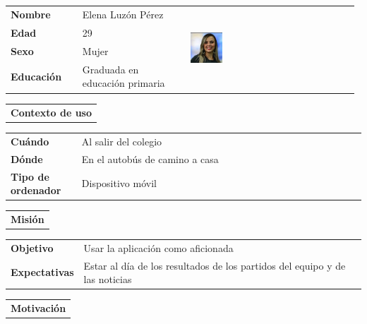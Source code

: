 \documentclass[11pt]{article}
\begin{document}
\begin{table}[H]
  \centering
  \begin{tabular}{p{0.2\linewidth}|p{0.3\linewidth}p{0.475\linewidth}}
    \toprule
    \textbf{Nombre} & Elena Luzón Pérez  &\multirow{4}{*}{\begin{minipage}{1.\textwidth}\includegraphics[width=0.2\textwidth, height=30mm]{Elena}\end{minipage}}\\
    \textbf{Edad} & 29 & \\
    \textbf{Sexo} & Mujer & \\
    \textbf{Educación} & Graduada en educación primaria & \\
    \bottomrule
  \end{tabular}

  \begin{tabular}{l}
    \textbf{Contexto de uso} 
  \end{tabular}
  
  \begin{tabular}{p{0.2\linewidth}|p{0.8\linewidth}}
    \toprule
    \textbf{Cuándo} & Al salir del colegio\\
    \textbf{Dónde}  & En el autobús de camino a casa\\
    \textbf{Tipo de ordenador} & Dispositivo móvil\\
    \bottomrule
  \end{tabular}

  \begin{tabular}{l}
    \textbf{Misión} 
  \end{tabular}
  
  \begin{tabular}{p{0.2\linewidth}|p{0.8\linewidth}}
    \toprule
    \textbf{Objetivo} & Usar la aplicación como aficionada\\
    \textbf{Expectativas}  & Estar al día de los resultados de los partidos del equipo y de las noticias \\
    \bottomrule
  \end{tabular}

  \begin{tabular}{l}
    \textbf{Motivación} 
  \end{tabular}


\end{table}
\end{document}
